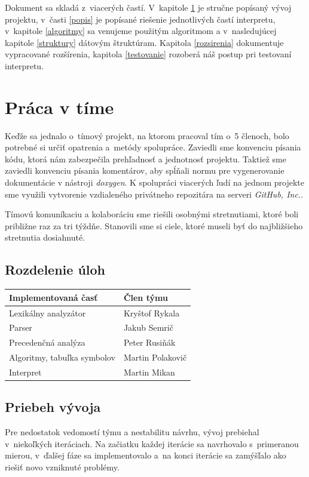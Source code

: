 \documentclass[11pt,a4paper]{article}
\begin{document}
	Dokument sa skladá z~viacerých častí. V~kapitole \ref{tim} je stručne popísaný vývoj projektu, v~časti \ref{popis} je popísané riešenie jednotlivých častí interpretu, v~kapitole \ref{algoritmy} sa venujeme použitým algoritmom a v~nasledujúcej kapitole \ref{struktury} dátovým štruktúram. Kapitola \ref{rozsirenia} dokumentuje vypracované rozšírenia, kapitola \ref{testovanie} rozoberá náš postup pri testovaní interpretu.


	\section{Práca v tíme}
	\label{tim}

	Keďže sa jednalo o~tímový projekt, na ktorom pracoval tím o~5 členoch, bolo potrebné
    si určiť opatrenia a~metódy spolupráce.  Zaviedli sme konvenciu písania kódu, ktorá nám
    zabezpečila prehľadnosť a jednotnosť projektu. Taktiež sme zaviedli konvenciu písania
    komentárov, aby spĺňali normu pre vygenerovanie dokumentácie v nástroji \emph{doxygen}.
    K spolupráci viacerých ľudí na jednom projekte sme využili vytvorenie vzdialeného
    privátneho repozitára na serveri \emph{GitHub, Inc.}.

	Tímovú komuníkaciu a kolaboráciu sme riešili osobnými stretnutiami, ktoré boli približne
    raz za tri týždňe. Stanovili sme si ciele, ktoré museli byť do najbližšieho stretnutia dosiahnuté.

	\subsection{Rozdelenie úloh}
	\begin{center}
		\begin{tabular}{|l|l|}
			\hline
			\large{\textbf{Implementovaná časť}} & \large{\textbf{Člen týmu}}\\
			\hline
			\hline
			Lexikálny analyzátor & Kryštof Rykala \\
			\hline
			Parser & Jakub Semrič \\
			\hline
			Precedenčná analýza & Peter Rusiňák \\
			\hline
			Algoritmy, tabuľka symbolov & Martin Polakovič \\
			\hline
			Interpret & Martin Mikan \\
			\hline
		\end{tabular}
	\end{center}

	\subsection{Priebeh vývoja}
	\label{vyvoj}
	Pre nedostatok vedomostí týmu a nestabilitu návrhu, vývoj prebiehal v~niekoľkých
	iteráciach. Na začiatku každej iterácie sa navrhovalo s~primeranou mierou,
	v~ďalšej fáze sa implementovalo a~na konci iterácie sa zamýšľalo ako riešiť
	novo vzniknuté problémy.
\end{document}
